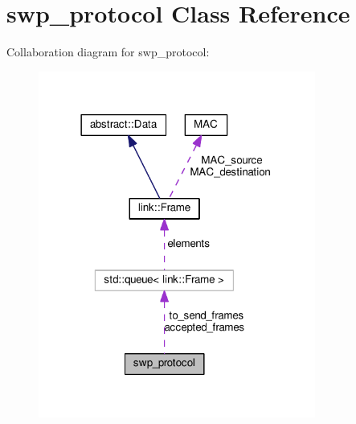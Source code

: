 \hypertarget{classswp__protocol}{}\section{swp\+\_\+protocol Class Reference}
\label{classswp__protocol}


Collaboration diagram for swp\+\_\+protocol\+:\nopagebreak
\begin{figure}[H]
\begin{center}
\leavevmode
\includegraphics[width=258pt]{classswp__protocol__coll__graph}
\end{center}
\end{figure}
